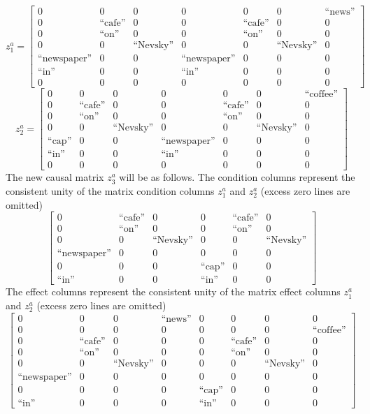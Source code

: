 \documentclass[12pt]{scrartcl}
\begin{document}
	\[
	z_1^a= \left[\begin{array}{ccc|cccc}
	0&0&0&0&0&0&\text{``news''}\\
	0&\text{``cafe''}&0&0&\text{``cafe''}&0&0\\
	0&\text{``on''}&0&0 &\text{``on''}&0&0\\
	0& 0& \text{``Nevsky''}&0 &0&\text{``Nevsky''}&0\\
	\text{``newspaper''}&0&0&\text{``newspaper''}&0&0&0\\
	\text{``in''} &0 &0 &\text{``in''}&0&0&0\\
	0&0 &0 & 0 &0&0&0
	\end{array}
	\right]
	\]
	\[
	z_2^a= \left[\begin{array}{ccc|cccc}
	0&0&0&0&0&0&\text{``coffee''}\\
	0&\text{``cafe''}&0&0&\text{``cafe''}&0&0\\
	0&\text{``on''}&0&0 &\text{``on''}&0&0\\
	0& 0& \text{``Nevsky''}&0 &0&\text{``Nevsky''}&0\\
	\text{``cap''}&0&0&\text{``newspaper''}&0&0&0\\
	\text{``in''} &0 &0 &\text{``in''}&0&0&0\\
	0&0 &0 & 0 &0&0&0
	\end{array}
	\right]
	\] 
	The new causal matrix $z_3^a$ will be as follows. The condition columns represent the consistent unity of the matrix condition columns $z_1^a$ and $z_2^a$ (excess zero lines are omitted)
	\[
	\left[\begin{array}{cccccc}
	0&\text{``cafe''}&0&0&\text{``cafe''}&0\\
	0&\text{``on''}&0&0 &\text{``on''}&0\\
	0& 0& \text{``Nevsky''}&0 &0&\text{``Nevsky''}\\
	\text{``newspaper''}&0&0&0&0&0\\
	0&0&0&\text{``cap''}&0&0\\
	\text{``in''} &0 &0 &\text{``in''}&0&0
	\end{array}
	\right]
	\]
	The effect columns represent the consistent unity of the matrix effect columns $z_1^a$ and $z_2^a$ (excess zero lines are omitted)
	\[
	\left[\begin{array}{cccccccc}
	0&0 &0 &\text{``news''}&0&0&0&0\\
	0&0 &0 &0&0&0&0&\text{``coffee''}\\	
	0&\text{``cafe''}&0&0&0&\text{``cafe''}&0&0\\
	0&\text{``on''}&0&0&0 &\text{``on''}&0&0\\
	0& 0& \text{``Nevsky''}&0&0 &0&\text{``Nevsky''}&0\\
	\text{``newspaper''}&0&0&0&0&0&0&0\\
	0&0&0&0&\text{``cap''}&0&0&0\\
	\text{``in''} &0 &0&0&\text{``in''}&0&0&0
	\end{array}
	\right]
	\]
	
\end{document}
